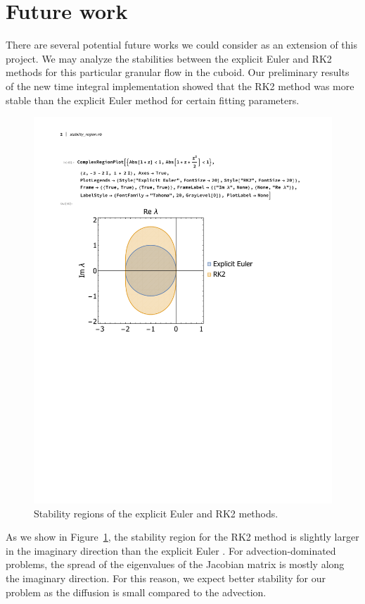 \section{Future work}
There are several potential future works we could consider as an extension of this project. 
We may analyze the stabilities between the explicit Euler and RK2 methods for this particular granular flow in the cuboid.
Our preliminary results of the new time integral implementation showed that the RK2 method was more stable than the explicit Euler method for certain fitting parameters.
\begin{figure}[ht]
  \begin{center}
    \includegraphics[scale=0.65]{figures/fig_stability_RK_Euler.pdf}
    \end{center}
  \caption{Stability regions of the explicit Euler and RK2 methods. }
  \label{fig_stability_RK_Euler}
\end{figure}
As we show in Figure~\ref{fig_stability_RK_Euler}, the stability region for the RK2 method is slightly larger in the imaginary direction than the explicit Euler \cite{griffiths_numerical_2010}. For advection-dominated problems, the spread of the eigenvalues of the Jacobian matrix is mostly along the imaginary direction. For this reason, we expect better stability for our problem as the diffusion is small compared to the advection. 
